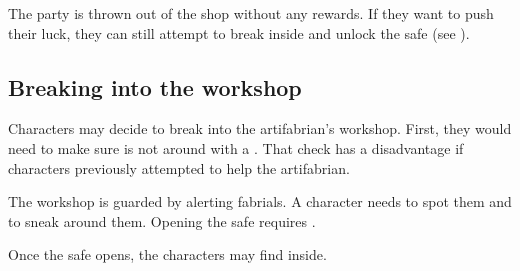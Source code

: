 
The party is thrown out of the shop without any rewards. If they want to push their luck, they can still attempt to break inside and unlock the safe (see ).

\subsection{Breaking into the workshop}
\label{ssec:artifabrianHeist}

Characters may decide to break into the artifabrian's workshop. First, they would need to make sure \npcArtifabrian{} is not around with a . That check has a disadvantage if characters previously attempted to help the artifabrian.

The workshop is guarded by alerting fabrials. A character needs  to spot them and  to sneak around them. Opening the safe requires .

Once the safe opens, the characters may find \lootPerfectGemstone{} inside.